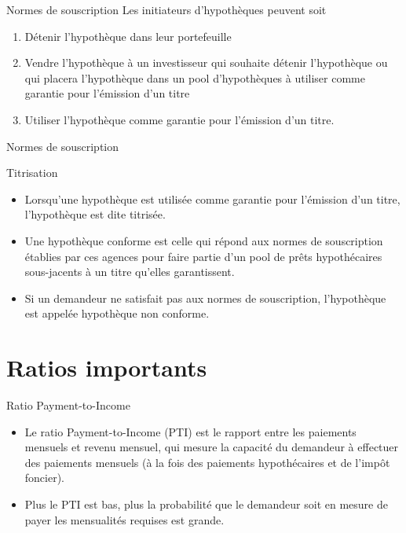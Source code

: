 \documentclass[10pt,a4paper]{beamer}
\begin{document}
\begin{frame}{Normes de souscription}
Les initiateurs d'hypothèques peuvent soit
\begin{enumerate}[label=\arabic*)]
\item Détenir l'hypothèque dans leur portefeuille
\item Vendre l'hypothèque à un investisseur qui souhaite détenir l'hypothèque ou qui placera l'hypothèque dans un pool d'hypothèques à utiliser comme garantie pour l'émission d'un titre
\item Utiliser l'hypothèque comme garantie pour l'émission d'un titre.
\end{enumerate}
\end{frame}

\begin{frame}{Normes de souscription}
\begin{block}{Titrisation}
\begin{itemize}[label=\bullet]
\item Lorsqu'une hypothèque est utilisée comme garantie pour l'émission d'un titre, l'hypothèque est dite titrisée.
\item Une hypothèque conforme est celle qui répond aux normes de souscription établies par ces agences pour faire partie d'un pool de prêts hypothécaires sous-jacents à un titre qu'elles garantissent.
\item Si un demandeur ne satisfait pas aux normes de souscription, l'hypothèque est appelée hypothèque non conforme.
\end{itemize}
\end{block}
\end{frame}

\section{Ratios importants}

\begin{frame}{Ratio Payment-to-Income}
\begin{itemize}[label=\bullet]
\item Le ratio Payment-to-Income (PTI) est le rapport entre les paiements mensuels et revenu mensuel, qui mesure la capacité du demandeur à effectuer des paiements mensuels (à la fois des paiements hypothécaires et de l'impôt foncier).
\vspace{0.5cm}
\item Plus le PTI est bas, plus la probabilité que le demandeur soit en mesure de payer les mensualités requises est grande.
\end{itemize}
\end{frame}
\end{document}
